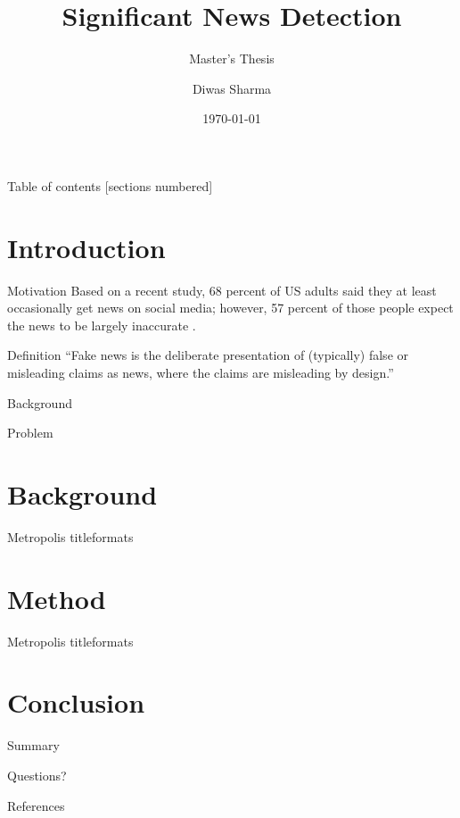 \documentclass[12pt]{beamer}
\title{Significant News Detection}
\subtitle{Master's Thesis}
\date{\today}
\author{Diwas Sharma}
\institute{The University of Alabama in Huntsville}
\begin{document}
\maketitle

\begin{frame}{Table of contents}
  [sections numbered]
  \tableofcontents[hideallsubsections]
\end{frame}

\section{Introduction}

\begin{frame}[fragile]{Motivation}
    Based on a recent study, 68 percent of US adults said they at least occasionally get news
    on social media; however, 57 percent of those people expect the news to be largely inaccurate \cite{matsa2018news}.
\end{frame}

\begin{frame}[fragile]{Definition}
    \enquote{Fake news is the deliberate presentation of (typically) false or misleading claims as news, where the claims are misleading by design.} \cite{gelfert2018fake}
\end{frame}

\begin{frame}[fragile]{Background}
\end{frame}

\begin{frame}[fragile]{Problem}
\end{frame}

\section{Background}

\begin{frame}{Metropolis titleformats}
\end{frame}

\section{Method}
\begin{frame}{Metropolis titleformats}
\end{frame}

\section{Conclusion}

\begin{frame}{Summary}

\end{frame}

{
\begin{frame}[standout]
  Questions?
\end{frame}
}

\appendix

\begin{frame}[allowframebreaks]{References}
    
    

\end{frame}
\end{document}
